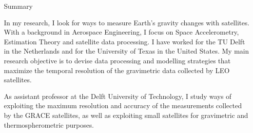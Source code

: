 
\begin{cvtext}{Summary}





In my research, I look for ways to measure Earth's gravity changes with satellites.
With a background in Aerospace Engineering, I focus on Space Accelerometry, Estimation Theory and satellite data processing.
I have worked for the TU Delft in the Netherlands and for the University of Texas in the United States.
My main research objective is to devise data processing and modelling strategies that maximize the temporal resolution of the gravimetric data collected by LEO satellites.

As assistant professor at the Delft University of Technology, I study ways of exploiting the maximum resolution and accuracy of the measurements collected by the \ac{GRACE} satellites, as well as exploiting small satellites for gravimetric and thermospherometric purposes.


\end{cvtext}
